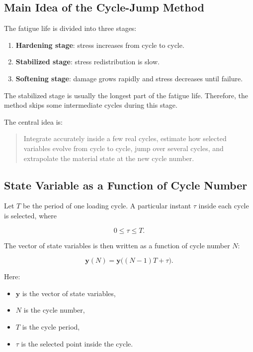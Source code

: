 ﻿\documentclass[11pt,a4paper]{article}
\begin{document}
\subsection{Main Idea of the Cycle-Jump Method}

The fatigue life is divided into three stages:

\begin{enumerate}[leftmargin=*]
    \item \textbf{Hardening stage}: stress increases from cycle to cycle.
    \item \textbf{Stabilized stage}: stress redistribution is slow.
    \item \textbf{Softening stage}: damage grows rapidly and stress decreases until failure.
\end{enumerate}

The stabilized stage is usually the longest part of the fatigue life. Therefore, the method skips some intermediate cycles during this stage.

The central idea is:

\begin{quote}
Integrate accurately inside a few real cycles, estimate how selected variables evolve from cycle to cycle, jump over several cycles, and extrapolate the material state at the new cycle number.
\end{quote}

\subsection{State Variable as a Function of Cycle Number}

Let $T$ be the period of one loading cycle. A particular instant $\tau$ inside each cycle is selected, where

\[
0 \leq \tau \leq T.
\]

The vector of state variables is then written as a function of cycle number $N$:

\[
\bm{y}(N)
=
\bm{y}\big((N-1)T+\tau\big).
\]

Here:

\begin{itemize}[leftmargin=*]
    \item $\bm{y}$ is the vector of state variables,
    \item $N$ is the cycle number,
    \item $T$ is the cycle period,
    \item $\tau$ is the selected point inside the cycle.
\end{itemize}
\end{document}
